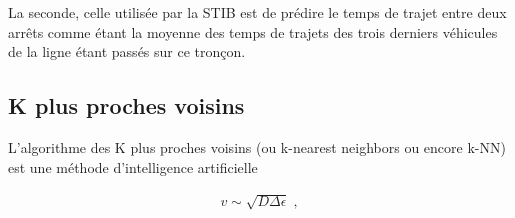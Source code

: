 \documentclass[letterpaper]{article}
\begin{document}
La seconde, celle utilisée par la STIB est de prédire le temps de trajet entre deux arrêts comme étant la moyenne des temps de trajets des trois derniers véhicules de la ligne étant passés sur ce tronçon.

\subsection{K plus proches voisins}

L'algorithme des K plus proches voisins (ou k-nearest neighbors ou encore k-NN) est une méthode d'intelligence artificielle \citep{trevor2009elements}


\begin{eqnarray}
v\sim\sqrt{D\Delta\epsilon}\;, \label{eq4}
\end{eqnarray}


\footnotesize


\end{document}
